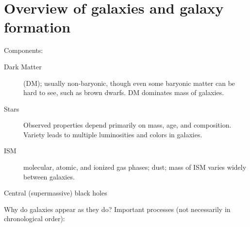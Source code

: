 \documentclass{article}
\begin{document}
\section{Overview of galaxies and galaxy formation}
Components:
\begin{description}
    \item [Dark Matter] (DM); usually non-baryonic, though even some baryonic
        matter can be hard to see, such as brown dwarfs. DM dominates mass of
        galaxies.
    \item [Stars] Observed properties depend primarily on mass, age,
        and composition. Variety leads to multiple luminosities and colors
        in galaxies.
    \item [ISM] molecular, atomic, and ionized gas phases; dust; mass
        of ISM varies widely between galaxies.
    \item [Central (supermassive) black holes]
\end{description}
Why do galaxies appear as they do? Important processes (not necessarily
in chronological order):
\end{document}
